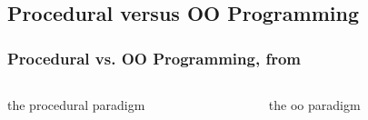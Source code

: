 \documentclass[9pt]{beamer}
\begin{document}
\subsection[ProceduralVsOO]{Procedural versus OO Programming}
\begin{frame}
\frametitle{Procedural vs. OO Programming, from \cite{Stefan}}
\begin{columns}[c]
  \begin{column}{.49\textwidth}

      \begin{block}{the procedural paradigm}
        \begin{center}
      \end{center}
      \end{block}
   
  \end{column}
\hfill
\pause
  \begin{column}{.49\textwidth}

      \begin{block}{the oo paradigm}
        \begin{center}
        \end{center}
      \end{block}
      

\end{column}
\end{columns}
\end{frame}
\end{document}
